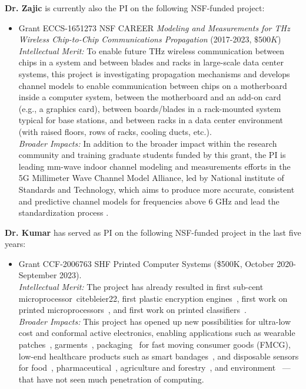 \documentclass[11 pt]{article}
\begin{document}
{\bf Dr. Zajic} is currently also the PI on the following NSF-funded project:
\begin{itemize}[topsep=0pt,itemsep=0pt]
\item Grant ECCS-1651273 NSF CAREER \textit{Modeling and Measurements for THz Wireless Chip-to-Chip Communications Propagation} (2017-2023, $\$500K$) \\
\textit{Intellectual Merit:}
To enable future THz wireless communication between chips in a system and between blades and racks in large-scale data center systems, this project is investigating  propagation mechanisms \cite{Cheng2020,Kim2016,Fu2019} and develops channel models \cite{Kim2016a,Fu2020} to enable communication between chips on a motherboard inside a computer system, between the motherboard and an add-on card (e.g., a graphics card), between boards/blades in a rack-mounted system typical for base stations, and between racks in a data center environment (with raised floors, rows of racks, cooling ducts, etc.). \\
\textit{Broader Impacts:}
In addition to the broader impact within the research community and training graduate students funded by this grant, the PI is leading mm-wave indoor channel modeling and measurements efforts in the 5G Millimeter Wave Channel Model Alliance, led by National institute of Standards and Technology, which aims to produce more accurate, consistent and predictive channel models for frequencies above 6 GHz and lead the standardization process \cite{Book}.
\end{itemize}

{\bf Dr. Kumar} has served as PI on the following NSF-funded project in
the last five years:
\begin{itemize}[topsep=0pt,itemsep=0pt]
\item Grant CCF-2006763 SHF Printed Computer Systems (\$500K, October 2020- September 2023).\\
\textit{Intellectual Merit:} The project has already resulted in first sub-cent microprocessor~cite{bleier22}, first plastic encryption engines~\cite{bleier23},
first work on printed microprocessors~\cite{bleier2020printed}, and first work on printed classifiers~\cite{mubarik20}.\\
\textit{Broader Impacts:} This project has opened up new possibilities for ultra-low cost and conformal active electronics, enabling applications such as wearable patches~\cite{8502791},
garments~\cite{garments}, packaging~\cite{gethin2013printed} for fast moving consumer goods (FMCG), low-end healthcare products such as smart
bandages~\cite{DERAKHSHANDEH20181259}, and disposable sensors for food~\cite{7994325}, pharmaceutical~\cite{BERGAMINI200554},
agriculture and forestry~\cite{chemosensors8040125}, and environment~\cite{MARRAZZA1999297} --- that have not seen much penetration of computing.
\end{itemize}



\end{document}
